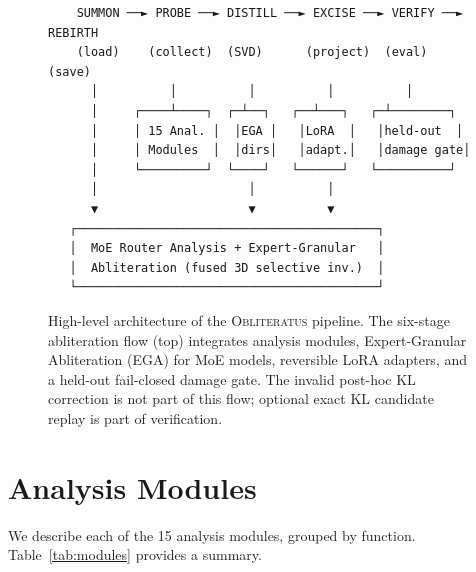 \documentclass[11pt]{article}
\begin{document}
\begin{figure}[t]
\centering
\small
\begin{verbatim}
    SUMMON ──► PROBE ──► DISTILL ──► EXCISE ──► VERIFY ──► REBIRTH
    (load)    (collect)  (SVD)      (project)  (eval)     (save)
      │          │          │          │          │
      │     ┌────┴────┐  ┌─┴──┐   ┌──┴───┐   ┌─┴────────┐
      │     │ 15 Anal. │  │EGA │   │LoRA  │   │held-out  │
      │     │ Modules  │  │dirs│   │adapt.│   │damage gate│
      │     └─────────┘  └────┘   └──────┘   └──────────┘
      │                     │          │
      ▼                     ▼          ▼
   ┌──────────────────────────────────────────┐
   │  MoE Router Analysis + Expert-Granular   │
   │  Abliteration (fused 3D selective inv.)  │
   └──────────────────────────────────────────┘
\end{verbatim}
\caption{High-level architecture of the \textsc{Obliteratus} pipeline. The six-stage abliteration flow (top) integrates analysis modules, Expert-Granular Abliteration (EGA) for MoE models, reversible LoRA adapters, and a held-out fail-closed damage gate. The invalid post-hoc KL correction is not part of this flow; optional exact KL candidate replay is part of verification.}
\label{fig:architecture}
\end{figure}

\section{Analysis Modules}
\label{sec:analysis}

We describe each of the 15 analysis modules, grouped by function. Table~\ref{tab:modules} provides a summary.
\end{document}
